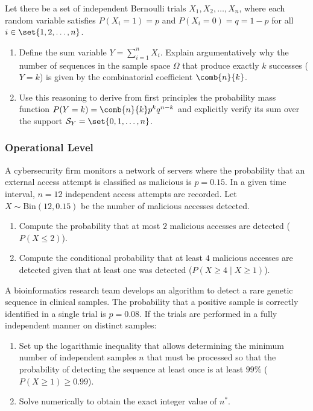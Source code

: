 \begin{problema}
	\label{prob:3.4.3}
	Let there be a set of independent Bernoulli trials $X_1, X_2, \dots, X_n$, where each random variable satisfies $P(X_i = 1) = p$ and $P(X_i = 0) = q = 1-p$ for all $i \in \set{1, 2, \dots, n}$.
	\begin{enumerate}
		\item Define the sum variable $Y = \sum_{i=1}^n X_i$. Explain argumentatively why the number of sequences in the sample space $\Omega$ that produce exactly $k$ successes ($Y = k$) is given by the combinatorial coefficient $\comb{n}{k}$.
		\item Use this reasoning to derive from first principles the probability mass function $P(Y = k) = \comb{n}{k} p^k q^{n-k}$ and explicitly verify its sum over the support $\mathcal{S}_Y = \set{0, 1, \dots, n}$.
	\end{enumerate}
\end{problema}

\subsubsection*{Operational Level}

\begin{problema}
	\label{prob:3.4.4}
	A cybersecurity firm monitors a network of servers where the probability that an external access attempt is classified as malicious is $p = 0.15$. In a given time interval, $n = 12$ independent access attempts are recorded. Let $X \sim \text{Bin}(12, 0.15)$ be the number of malicious accesses detected.
	\begin{enumerate}
		\item Compute the probability that at most $2$ malicious accesses are detected ($P(X \le 2)$).
		\item Compute the conditional probability that at least $4$ malicious accesses are detected given that at least one was detected ($P(X \ge 4 \mid X \ge 1)$).
	\end{enumerate}
\end{problema}

\begin{problema}
	\label{prob:3.4.5}
	A bioinformatics research team develops an algorithm to detect a rare genetic sequence in clinical samples. The probability that a positive sample is correctly identified in a single trial is $p = 0.08$. If the trials are performed in a fully independent manner on distinct samples:
	\begin{enumerate}
		\item Set up the logarithmic inequality that allows determining the minimum number of independent samples $n$ that must be processed so that the probability of detecting the sequence at least once is at least $99\%$ ($P(X \ge 1) \ge 0.99$).
		\item Solve numerically to obtain the exact integer value of $n^*$.
	\end{enumerate}
\end{problema}

